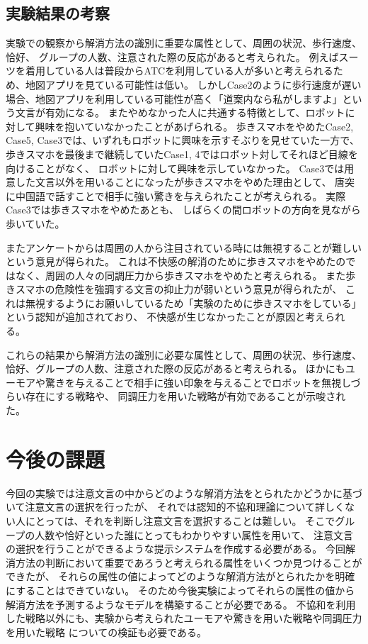 \documentclass{kuisthesis}
\begin{document}
\subsection{実験結果の考察}
実験での観察から解消方法の識別に重要な属性として、周囲の状況、歩行速度、恰好、
グループの人数、注意された際の反応があると考えられた。
例えばスーツを着用している人は普段からATCを利用している人が多いと考えられるため、地図アプリを見ている可能性は低い。
しかしCase2のように歩行速度が遅い場合、地図アプリを利用している可能性が高く「道案内なら私がしますよ」という文言が有効になる。
またやめなかった人に共通する特徴として、ロボットに対して興味を抱いていなかったことがあげられる。
歩きスマホをやめたCase2, Case5, Case3では、いずれもロボットに興味を示すそぶりを見せていた一方で、
歩きスマホを最後まで継続していたCase1, 4ではロボット対してそれほど目線を向けることがなく、
ロボットに対して興味を示していなかった。
Case3では用意した文言以外を用いることになったが歩きスマホをやめた理由として、
唐突に中国語で話すことで相手に強い驚きを与えられたことが考えられる。
実際Case3では歩きスマホをやめたあとも、
しばらくの間ロボットの方向を見ながら歩いていた。


またアンケートからは周囲の人から注目されている時には無視することが難しいという意見が得られた。
これは不快感の解消のために歩きスマホをやめたのではなく、周囲の人々の同調圧力から歩きスマホをやめたと考えられる。
また歩きスマホの危険性を強調する文言の抑止力が弱いという意見が得られたが、
これは無視するようにお願いしているため「実験のために歩きスマホをしている」という認知が追加されており、
不快感が生じなかったことが原因と考えられる。

これらの結果から解消方法の識別に必要な属性として、周囲の状況、歩行速度、恰好、グループの人数、注意された際の反応があると考えられる。
ほかにもユーモアや驚きを与えることで相手に強い印象を与えることでロボットを無視しづらい存在にする戦略や、
同調圧力を用いた戦略が有効であることが示唆された。

\section{今後の課題}
今回の実験では注意文言の中からどのような解消方法をとられたかどうかに基づいて注意文言の選択を行ったが、
それでは認知的不協和理論について詳しくない人にとっては、それを判断し注意文言を選択することは難しい。
そこでグループの人数や恰好といった誰にとってもわかりやすい属性を用いて、
注意文言の選択を行うことができるような提示システムを作成する必要がある。
今回解消方法の判断において重要であろうと考えられる属性をいくつか見つけることができたが、
それらの属性の値によってどのような解消方法がとられたかを明確にすることはできていない。
そのため今後実験によってそれらの属性の値から解消方法を予測するようなモデルを構築することが必要である。
不協和を利用した戦略以外にも、実験から考えられたユーモアや驚きを用いた戦略や同調圧力を用いた戦略
についての検証も必要である。
\end{document}

